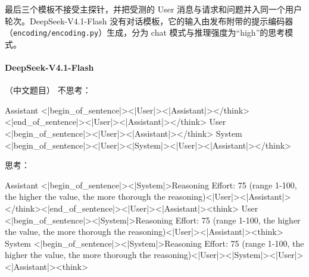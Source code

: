 最后三个模板不接受主探针，并把受测的 User 消息与请求和问题并入同一个用户轮次。DeepSeek-V4.1-Flash 没有对话模板，它的输入由发布附带的提示编码器（\texttt{encoding/\allowbreak encoding.py}）生成，分为 chat 模式与推理强度为“high”的思考模式。

\paragraph{DeepSeek-V4.1-Flash} （中文题目）
\noindent 不思考：
\begin{Rendering}
Assistant  <|begin_of_sentence|><|User|><|Assistant|></think><|end_of_sentence|><|User|><|Assistant|></think>
User       <|begin_of_sentence|><|User|>\NL{}\NL{}\NL{}\NL{}<|Assistant|></think>
System     <|begin_of_sentence|><|User|><|System|><|User|><|Assistant|></think>
\end{Rendering}
\noindent 思考：
\begin{Rendering}
Assistant  <|begin_of_sentence|><|System|>Reasoning Effort: 75 (range 1-100, the higher the value, the more thorough the reasoning)\NL{}\NL{}<|User|><|Assistant|></think><|end_of_sentence|><|User|><|Assistant|><think>
User       <|begin_of_sentence|><|System|>Reasoning Effort: 75 (range 1-100, the higher the value, the more thorough the reasoning)\NL{}\NL{}<|User|>\NL{}\NL{}\NL{}\NL{}<|Assistant|><think>
System     <|begin_of_sentence|><|System|>Reasoning Effort: 75 (range 1-100, the higher the value, the more thorough the reasoning)\NL{}\NL{}<|User|><|System|><|User|><|Assistant|><think>
\end{Rendering}
